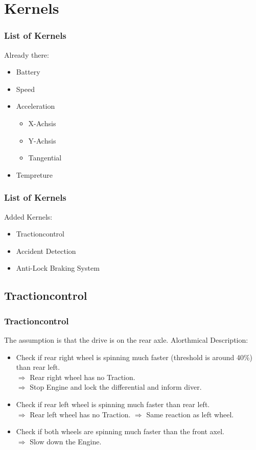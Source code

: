 \documentclass{beamer}
\begin{document}
\section{Kernels}
\begin{frame} %
  \frametitle{List of Kernels} %
  Already there:
  \begin{itemize}
   \item Battery
   \item Speed
   \item Acceleration
   \begin{itemize}
    \item X-Achsis
    \item Y-Achsis
    \item Tangential
   \end{itemize}
   \item Tempreture
  \end{itemize}

\end{frame}
\begin{frame}
    \frametitle{List of Kernels}
    Added Kernels:
    \begin{itemize}
     \item Tractioncontrol
     \item Accident Detection
     \item Anti-Lock Braking System
    \end{itemize}
\end{frame}
\subsection{Tractioncontrol}
\begin{frame}
    \frametitle{Tractioncontrol}
    The assumption is that the drive is on the rear axle.
    Alorthmical Description:
    \begin{itemize}
     \item Check if rear right wheel is spinning much faster (threshold is around 40\%) than rear left.\\
     $\Rightarrow$ Rear right wheel has no Traction.\\
     $\Rightarrow$ Stop Engine and lock the differential and inform diver.
     \pause
     \item Check if rear left wheel is spinning much faster than rear left.\\
     $\Rightarrow$ Rear left wheel has no Traction. $\Rightarrow$ Same reaction as left wheel.
     \pause
     \item Check if both wheels are spinning much faster than the front axel.\\
     $\Rightarrow$ Slow down the Engine.
    \end{itemize}
\end{frame}
\end{document}
